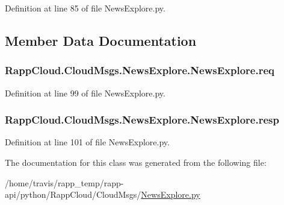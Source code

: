 Definition at line 85 of file News\-Explore.\-py.



\subsection{Member Data Documentation}
\hypertarget{classRappCloud_1_1CloudMsgs_1_1NewsExplore_1_1NewsExplore_a37f1a4ee5dfd9a3612ae277da19fd896}{
\subsubsection[{req}]{\setlength{\rightskip}{0pt plus 5cm}Rapp\-Cloud.\-Cloud\-Msgs.\-News\-Explore.\-News\-Explore.\-req}}\label{classRappCloud_1_1CloudMsgs_1_1NewsExplore_1_1NewsExplore_a37f1a4ee5dfd9a3612ae277da19fd896}


Definition at line 99 of file News\-Explore.\-py.

\hypertarget{classRappCloud_1_1CloudMsgs_1_1NewsExplore_1_1NewsExplore_a12c7c1b315d67d7009b4c737e1a9557d}{
\subsubsection[{resp}]{\setlength{\rightskip}{0pt plus 5cm}Rapp\-Cloud.\-Cloud\-Msgs.\-News\-Explore.\-News\-Explore.\-resp}}\label{classRappCloud_1_1CloudMsgs_1_1NewsExplore_1_1NewsExplore_a12c7c1b315d67d7009b4c737e1a9557d}


Definition at line 101 of file News\-Explore.\-py.



The documentation for this class was generated from the following file\-:\begin{DoxyCompactItemize}
\item 
/home/travis/rapp\-\_\-temp/rapp-\/api/python/\-Rapp\-Cloud/\-Cloud\-Msgs/\hyperlink{NewsExplore_8py}{News\-Explore.\-py}\end{DoxyCompactItemize}
